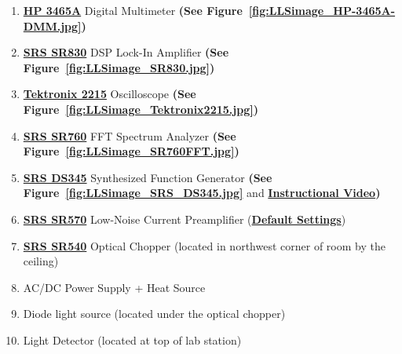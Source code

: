 \documentclass{../lab}
\begin{document}
\begin{enumerate}
    \item \href{https://drive.google.com/file/d/1mC_1LdkyNy9e9ecIXuikxHF6X8dZ8U4V/view?usp=drive_link}{\textbf{HP 3465A}} Digital Multimeter \textbf{(See Figure~\ref{fig:LLSimage_HP-3465A-DMM.jpg})}

    \item \href{https://drive.google.com/file/d/1zABBSjyMme28RPHkWtwhXKmQs5fee2mt/view?usp=drive_link}{\textbf{SRS SR830}} DSP Lock-In Amplifier \textbf{(See Figure~\ref{fig:LLSimage_SR830.jpg})}
    
    \item
    \href{https://drive.google.com/file/d/1Eenw-CAqlwEQ2r7Pk0ohcza-YNpEu6aE/view?usp=drive_link}{\textbf{Tektronix 2215}} Oscilloscope \textbf{(See Figure~\ref{fig:LLSimage_Tektronix2215.jpg})} 

    \item \href{https://drive.google.com/file/d/1bXw4ID5eT8MgCi6g4nNpWXdKhtATavFg/view?usp=drive_link}{\textbf{SRS SR760}} FFT Spectrum Analyzer \textbf{(See Figure~\ref{fig:LLSimage_SR760FFT.jpg})}

    \item \href{https://drive.google.com/file/d/19xzJUfYfb2jPennFmJmfJLPGrieob05C/view?usp=drive_link}{\textbf{SRS DS345}} Synthesized Function Generator \textbf{(See Figure~\ref{fig:LLSimage_SRS_DS345.jpg}} and \href{https://youtu.be/PrM8DHFOFS0}{\textbf{Instructional Video}}\textbf{)}

    \item \href{https://drive.google.com/file/d/13_Stzrxt9jcWLl1jAA6dzxwV33Tsb9Cl/view?usp=drive_link}{\textbf{SRS SR570}} Low-Noise Current Preamplifier (\href{https://berkeley-physics111b.github.io/appendices/defaultsettings/}{\textbf{Default Settings}})    

    \item
    \href{https://drive.google.com/file/d/1HTAcpH-GPmNyBxJvBN9QuAp1dxoHl0mD/view?usp=drive_link}{\textbf{SRS SR540}} Optical Chopper (located in northwest corner of room by the ceiling)
    
    \item AC/DC Power Supply + Heat Source
    
    \item Diode light source (located under the optical chopper)

    \item Light Detector (located at top of lab station)

\end{enumerate}
\end{document}
